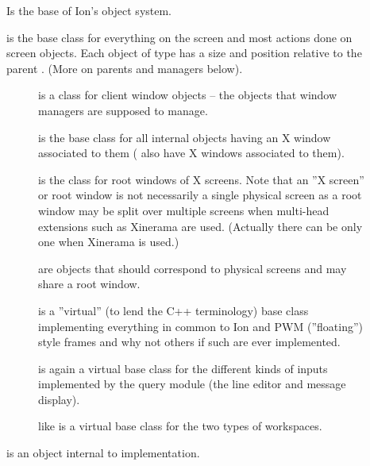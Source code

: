 \begin{description}
  \item[]
    Is the base of Ion's object system.
  \item[]
    is the base class for everything on the screen
    and most actions done on screen objects. Each object of type
      has a size and position relative to the parent
    . (More on parents and managers below).
    \begin{description}
      \item[] is a class for
	client window objects -- the objects that window managers are
	supposed to manage.
      \item[] is the base class for all
	internal objects having an X window associated to them
	( also have X windows associated to them).
	
      \item[] is the class for
	root windows of X screens.
	Note that an ''X screen'' or root window is not necessarily a
	single  physical screen as a root window
	may be split over multiple screens when multi-head extensions 
	such as Xinerama are used. (Actually there
	can be only one  when Xinerama is used.)
	
      \item[] are objects that should
	correspond to physical screens and may share a root window.
	
      \item[] is a ''virtual'' (to
	lend the C++ terminology) base class implementing everything in
	common to Ion and PWM (''floating'') style frames and why not others
	if such are ever implemented.
	
      \item[] is again a virtual base class
	for the different kinds of inputs implemented by the query module
	(the line editor and message display).
	
      \item[] like  is a
	virtual base class for the two types of workspaces.
    \end{description}
    
  \item[] is an object internal to
     implementation.
\end{description}


